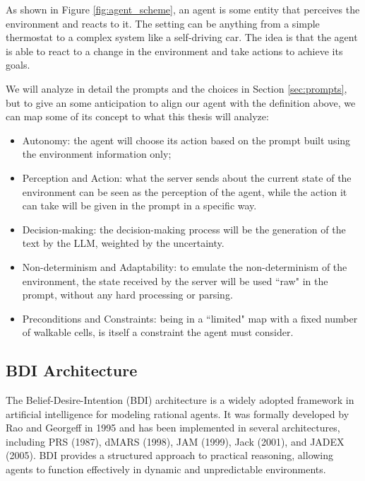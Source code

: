 As shown in Figure \ref{fig:agent_scheme}, an agent is some entity that
perceives the environment and reacts to it. The setting can be anything from a simple
thermostat to a complex system like a self-driving car. The idea is that the
agent is able to react to a change in the environment and take actions to
achieve its goals.

We will analyze in detail the prompts and the choices in Section
\ref{sec:prompts}, but to give an some anticipation to align our agent with the definition
above, we can map some of its concept to what this thesis will analyze:
\begin{itemize}
  \item Autonomy: the agent will choose its action based on the prompt built
    using the environment information only;

  \item Perception and Action: what the server sends about the current state of
    the environment can be seen as the perception of the agent, while the action
    it can take will be given in the prompt in a specific way.

  \item Decision-making: the decision-making process will be the generation of
    the text by the LLM, weighted by the uncertainty.

  \item Non-determinism and Adaptability: to emulate the non-determinism of the
    environment, the state received by the server will be used ``raw" in the
    prompt, without any hard processing or parsing.

  \item Preconditions and Constraints: being in a ``limited" map with a fixed number
    of walkable cells, is itself a constraint the agent must consider.
\end{itemize}

\subsection{BDI Architecture}
\label{sub:bdi_architecture}

The Belief-Desire-Intention (BDI) architecture is a widely adopted framework in artificial
intelligence for modeling rational agents. It was formally developed by Rao and
Georgeff in 1995 \cite{bdi-icmas95} and has been implemented in several
architectures, including PRS (1987), dMARS (1998), JAM (1999), Jack (2001), and JADEX
(2005). BDI provides a structured approach to practical reasoning, allowing agents
to function effectively in dynamic and unpredictable environments.

